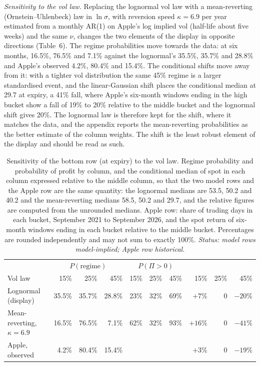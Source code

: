 \documentclass[11pt,a4paper]{article}
\begin{document}
\emph{Sensitivity to the vol law.} Replacing the lognormal vol law with a mean-reverting (Ornstein--Uhlenbeck) law in $\ln\sigma$, with reversion speed $\kappa = 6.9$ per year estimated from a monthly AR(1) on Apple's log implied vol (half-life about five weeks) and the same $\nu$, changes the two elements of the display in opposite directions (Table~6). The regime probabilities move towards the data: at six months, 16.5\%, 76.5\% and 7.1\% against the lognormal's 35.5\%, 35.7\% and 28.8\% and Apple's observed 4.2\%, 80.4\% and 15.4\%. The conditional shifts move away from it: with a tighter vol distribution the same 45\% regime is a larger standardised event, and the linear-Gaussian shift places the conditional median at 29.7 at expiry, a 41\% fall, where Apple's six-month windows ending in the high bucket show a fall of 19\% to 20\% relative to the middle bucket and the lognormal shift gives 20\%. The lognormal law is therefore kept for the shift, where it matches the data, and the appendix reports the mean-reverting probabilities as the better estimate of the column weights. The shift is the least robust element of the display and should be read as such.

\begin{table}[htbp]
\centering\small
\caption{Sensitivity of the bottom row (at expiry) to the vol law. Regime probability and probability of profit by column, and the conditional median of spot in each column expressed relative to the middle column, so that the two model rows and the Apple row are the same quantity: the lognormal medians are 53.5, 50.2 and 40.2 and the mean-reverting medians 58.5, 50.2 and 29.7, and the relative figures are computed from the unrounded medians. Apple row: share of trading days in each bucket, September 2021 to September 2026, and the spot return of six-month windows ending in each bucket relative to the middle bucket. Percentages are rounded independently and may not sum to exactly 100\%. \emph{Status: model rows model-implied; Apple row historical.}}
\setlength{\tabcolsep}{4.5pt}
\begin{tabular}{@{}lrrrrrrrrr@{}}
\toprule
&  &  &  \\
\cmidrule(lr){2-4}\cmidrule(lr){5-7}\cmidrule(lr){8-10}
Vol law & 15\% & 25\% & 45\% & 15\% & 25\% & 45\% & 15\% & 25\% & 45\% \\
\midrule
Lognormal (display) & 35.5\% & 35.7\% & 28.8\% & 23\% & 32\% & 69\% & $+7\%$ & 0 & $-20\%$ \\
Mean-reverting, $\kappa = 6.9$ & 16.5\% & 76.5\% & 7.1\% & 62\% & 32\% & 93\% & $+16\%$ & 0 & $-41\%$ \\
Apple, observed & 4.2\% & 80.4\% & 15.4\% & & & & $+3\%$ & 0 & $-19\%$ \\
\bottomrule
\end{tabular}
\end{table}
\end{document}
